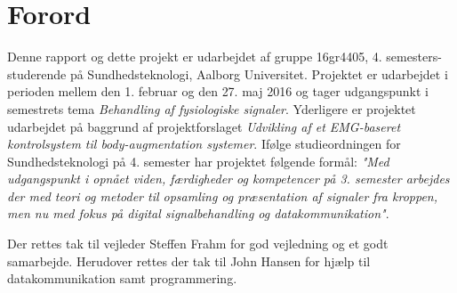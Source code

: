 \chapter*{Forord}
Denne rapport og dette projekt er udarbejdet af gruppe 16gr4405, 4. semesters-studerende på Sundhedsteknologi, Aalborg Universitet. Projektet er udarbejdet i perioden mellem den 1. februar og den 27. maj 2016 og tager udgangspunkt i semestrets tema \textit{Behandling af fysiologiske signaler}. Yderligere er projektet udarbejdet på baggrund af projektforslaget \textit{Udvikling af et EMG-baseret kontrolsystem til body-augmentation systemer}. Ifølge studieordningen for Sundhedsteknologi på 4. semester har projektet følgende formål: \textit{"Med udgangspunkt i opnået viden, færdigheder og kompetencer på 3. semester arbejdes der med teori og metoder til opsamling og præsentation af signaler fra kroppen, men nu med fokus på digital signalbehandling og datakommunikation"}. \citep{aalborguniversitet2014}

Der rettes tak til vejleder Steffen Frahm for god vejledning og et godt samarbejde. Herudover rettes der tak til John Hansen for hjælp til datakommunikation samt programmering. 